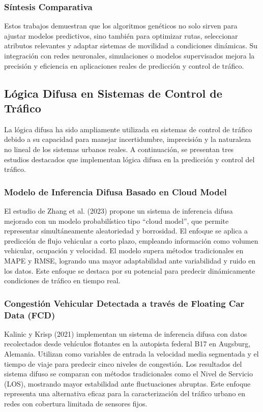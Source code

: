 \documentclass{svproc} %
\begin{document}
\subsubsection{Síntesis Comparativa}

Estos trabajos demuestran que los algoritmos genéticos no solo sirven para ajustar modelos predictivos, sino también para optimizar rutas, seleccionar atributos relevantes y adaptar sistemas de movilidad a condiciones dinámicas. Su integración con redes neuronales, simulaciones o modelos supervisados mejora la precisión y eficiencia en aplicaciones reales de predicción y control de tráfico.

\subsection{Lógica Difusa en Sistemas de Control de Tráfico}

La lógica difusa ha sido ampliamente utilizada en sistemas de control de tráfico debido a su capacidad para manejar incertidumbre, imprecisión y la naturaleza no lineal de los sistemas urbanos reales. A continuación, se presentan tres estudios destacados que implementan lógica difusa en la predicción y control del tráfico.

\subsubsection{Modelo de Inferencia Difusa Basado en Cloud Model}

El estudio de Zhang et al. (2023) propone un sistema de inferencia difusa mejorado con un modelo probabilístico tipo “cloud model”, que permite representar simul\-tánea\-mente aleatoriedad y borrosidad. El enfoque se aplica a predicción de flujo vehicular a corto plazo, empleando información como volumen vehicular, ocupación y velocidad. El modelo supera métodos tradicionales en MAPE y RMSE, logrando una mayor adaptabilidad ante variabilidad y ruido en los datos. Este enfoque se destaca por su potencial para predecir dinámicamente condiciones de tráfico en tiempo real.

\subsubsection{Congestión Vehicular Detectada a través de Floating Car Data (FCD)}

Kalinic y Krisp (2021) implementan un sistema de inferencia difusa con datos recolectados desde vehículos flotantes en la autopista federal B17 en Augsburg, Alemania. Utilizan como variables de entrada la velocidad media segmentada y el tiempo de viaje para predecir cinco niveles de congestión. Los resultados del sistema difuso se comparan con métodos tradicionales como el Nivel de Servicio (LOS), mostrando mayor estabilidad ante fluctuaciones abruptas. Este enfoque representa una alternativa eficaz para la caracterización del tráfico urbano en redes con cobertura limitada de sensores fijos.
\end{document}
